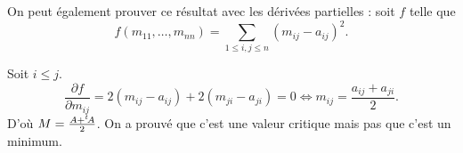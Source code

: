 On peut également prouver ce résultat avec les dérivées partielles : soit $f$ telle que \[
	f(m_{11},\ldots,m_{nn}) = \sum_{1\le i,j\le n} (m_{ij} - a_{ij})^2
.\]

Soit $i \le j$.
\[
	\frac{\partial f}{\partial m_{ij}} = 2(m_{ij}-a_{ij}) + 2(m_{ji}-a_{ji}) = 0 \iff m_{ij} = \frac{a_{ij}+a_{ji}}{2}
.\]
D'où $M = \frac{A + {}^t\! A}{2}$. On a prouvé que c'est une valeur critique mais pas que c'est un minimum.


